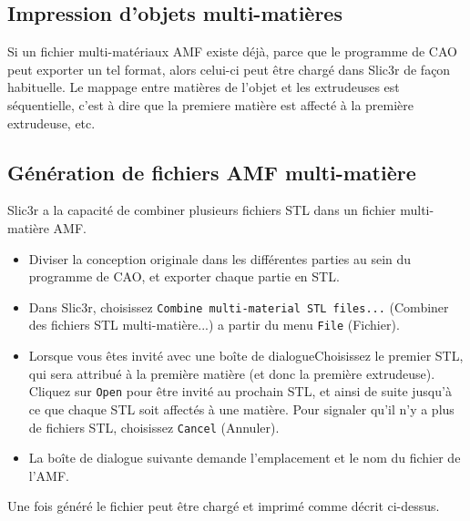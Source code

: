 

\subsection{Impression d'objets multi-mati\`eres} %
\label{sub:printing_multi_material_objects}

Si un fichier multi-mat\'eriaux AMF existe d\'ej\`a, parce que le programme de CAO peut exporter un tel format, alors celui-ci peut \^etre charg\'e dans Slic3r de façon habituelle. Le mappage entre mati\`eres de l'objet et les extrudeuses est s\'equentielle, c'est \`a dire que la premiere mati\`ere est affect\'e \`a la premi\`ere extrudeuse, etc.



\subsection{G\'en\'eration de fichiers AMF multi-mati\`ere} %
\label{sub:generating_multi_material_amf_files}

Slic3r a la capacit\'e de combiner plusieurs fichiers STL dans un fichier multi-mati\`ere AMF.


\begin{itemize}
    \item Diviser la conception originale dans les diff\'erentes parties au sein du programme de CAO, et exporter chaque partie en STL.
    \item Dans Slic3r, choisissez \texttt{Combine multi-material STL files...} (Combiner des fichiers STL multi-mati\`ere...) a partir du menu \texttt{File} (Fichier).
    \item Lorsque vous \^etes invit\'e avec une bo\^ite de dialogueChoisissez le premier STL, qui sera attribu\'e \`a la premi\`ere mati\`ere (et donc la premi\`ere extrudeuse). Cliquez sur \texttt{Open} pour \^etre invit\'e au prochain STL, et ainsi de suite jusqu'\`a ce que chaque STL soit affect\'es \`a une mati\`ere. Pour signaler qu'il n'y a plus de fichiers STL, choisissez \texttt{Cancel} (Annuler).
    \item La bo\^ite de dialogue suivante demande l'emplacement et le nom du fichier de l'AMF.
\end{itemize}

Une fois g\'en\'er\'e le fichier peut \^etre charg\'e et imprim\'e comme d\'ecrit ci-dessus.


